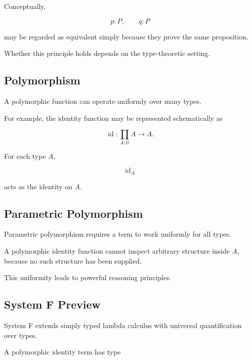 Conceptually,

\[
p:P,
\qquad
q:P
\]

may be regarded as equivalent simply because they prove the same
proposition.

Whether this principle holds depends on the type-theoretic setting.

\subsection{Polymorphism}
\label{subsec:type-theory-polymorphism}

A polymorphic function can operate uniformly over many types.

For example, the identity function may be represented schematically as

\[
\boxed{
\operatorname{id}
:
\prod_{A:\mathcal{U}}
A\to A.
}
\]

For each type \(A\),

\[
\operatorname{id}_A
\]

acts as the identity on \(A\).

\subsection{Parametric Polymorphism}
\label{subsec:parametric-polymorphism}

Parametric polymorphism requires a term to work uniformly for all types.

A polymorphic identity function cannot inspect arbitrary structure inside
\(A\), because no such structure has been supplied.

This uniformity leads to powerful reasoning principles.

\subsection{System F Preview}
\label{subsec:system-f-preview}

System F extends simply typed lambda calculus with universal quantification
over types.

A polymorphic identity term has type

